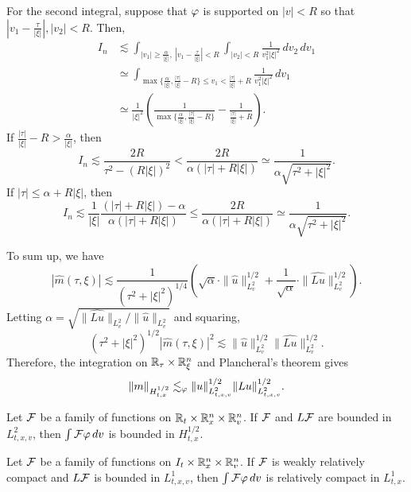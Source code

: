\documentclass[a4paper]{article}
\begin{document}
\begin{pf}
For the second integral, suppose that $\varphi$ is supported on $|v|<R$ so that $|v_1-\frac\tau{|\xi|}|,|v_2|<R$.
Then,
\begin{align*}
I_n&\lesssim\int_{|v_1|\ge\frac\alpha{|\xi|},\ |v_1-\frac\tau{|\xi|}|<R}\int_{|v_2|<R}\frac1{v_1^2|\xi|^2}\,dv_2\,dv_1\\
&\simeq\int_{\max\{\frac\alpha{|\xi|},\frac{|\tau|}{|\xi|}-R\}\le v_1<\frac{|\tau|}{|\xi|}+R}\frac1{v_1^2|\xi|^2}\,dv_1\\
&\simeq\frac1{|\xi|^2}(\frac1{\max\{\frac\alpha{|\xi|},\frac{|\tau|}{|\xi|}-R\}}-\frac1{\frac{|\tau|}{|\xi|}+R}).
\end{align*}
If $\frac{|\tau|}{|\xi|}-R>\frac\alpha{|\xi|}$, then
\[I_n\lesssim\frac{2R}{\tau^2-(R|\xi|)^2}<\frac{2R}{\alpha(|\tau|+R|\xi|)}\simeq\frac1{\alpha\sqrt{\tau^2+|\xi|^2}}.\]
If $|\tau|\le\alpha+R|\xi|$, then
\[I_n\lesssim\frac1{|\xi|}\frac{(|\tau|+R|\xi|)-\alpha}{\alpha(|\tau|+R|\xi|)}\le\frac{2R}{\alpha(|\tau|+R|\xi|)}\simeq\frac1{\alpha\sqrt{\tau^2+|\xi|^2}}.\]

To sum up, we have
\[|\hat m(\tau,\xi)|\lesssim\frac1{(\tau^2+|\xi|^2)^{1/4}}(\sqrt\alpha\cdot\|\hat u\|_{L_v^2}^{1/2}+\frac1{\sqrt\alpha}\cdot\|\hat{Lu}\|_{L_v^2}^{1/2}).\]
Letting $\alpha=\sqrt{\|\hat{Lu}\|_{L_v^2}/\|\hat u\|_{L_v^2}}$ and squaring,
\[(\tau^2+|\xi|^2)^{1/2}|\hat m(\tau,\xi)|^2\lesssim\|\hat u\|_{L_v^2}^{1/2}\|\hat{Lu}\|_{L_v^2}^{1/2}.\]
Therefore, the integration on $\mathbb{R}_\tau\times\mathbb{R}_\xi^n$ and Plancheral's theorem gives
\[\|m\|_{H_{t,x}^{1/2}}\lesssim_\varphi\|u\|_{L_{t,x,v}^2}^{1/2}\|Lu\|_{L_{t,x,v}^2}^{1/2}.\]
\end{pf}


\begin{cor}
Let $\mathcal{F}$ be a family of functions on $\mathbb{R}_t\times\mathbb{R}_x^n\times\mathbb{R}_v^n$.
If $\mathcal{F}$ and $L\mathcal{F}$ are bounded in $L_{t,x,v}^2$, then $\int\mathcal{F}\varphi\,dv$ is bounded in $H_{t,x}^{1/2}$.
\end{cor}

\begin{thm}
Let $\mathcal{F}$ be a family of functions on $I_t\times\mathbb{R}_x^n\times\mathbb{R}_v^n$.
If $\mathcal{F}$ is weakly relatively compact and $L\mathcal{F}$ is bounded in $L_{t,x,v}^1$, then $\int\mathcal{F}\varphi\,dv$ is relatively compact in $L_{t,x}^1$.
\end{thm}
\end{document}
